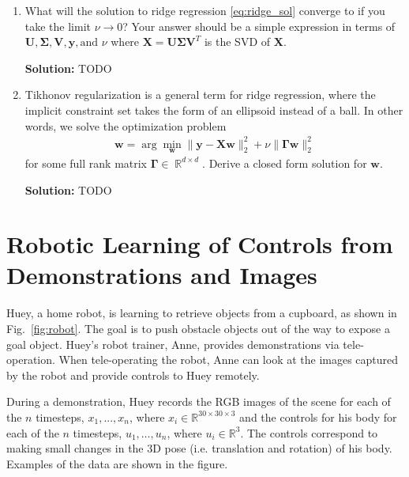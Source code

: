 \documentclass{article}
\newcommand{\mat}[1]{\mathbf{#1}}
\renewcommand{\vec}[1]{\boldsymbol{\mathbf{#1}}}
\newcommand{\Question}[1]{\Large \section{ #1 } \normalsize}
\DeclareMathOperator{\R}{\mathbb{R}}
\newenvironment{solution}{\color{blue} \smallskip \textbf{Solution:}}{}
\begin{document}
\begin{enumerate}
    \emph{Hint:} To make this point, it may be helpful to consider $\vec{w} = \vec{w}_0 + \vec{w}^*$ where $\vec{w}_0$ is in the null space of $\mat X$ and $\vec{w}^*$ is a solution.
    
    \begin{solution}
        TODO
    \end{solution}

    \newpage
    \item What will the solution to ridge regression \eqref{eq:ridge_sol} converge to if you take the limit $\nu \rightarrow 0$? Your answer should be a simple expression in terms of $\mat{U}, \mat{\Sigma}, \mat{V}, \vec{y}, \text{and } \nu$ where $\mat{X} = \mat{U}\mat{\Sigma}\mat{V}^{T}$ is the SVD of $\mat{X}$.
    
    \begin{solution}
        TODO
    \end{solution}

    \newpage
    \item Tikhonov regularization is a general term for ridge regression, where the implicit constraint set takes the form of an ellipsoid instead of a ball. In other words, we solve the optimization problem
    \begin{align*}
        \vec{w} = \arg\min_{\vec{w}} \|\vec{y} - \mat{X}\vec{w}\|_2^2 + \nu\|\mat{\Gamma}\vec{w}\|_2^2
    \end{align*}
    for some full rank matrix $\mat{\Gamma} \in \R^{d \times d}$. Derive a closed form solution for $\vec{w}$.
    
    \begin{solution}
        TODO
    \end{solution}

\end{enumerate}

\newpage
\Question{Robotic Learning of Controls from Demonstrations and Images}

Huey, a home robot, is learning to retrieve objects from a cupboard, as shown in Fig.~\ref{fig:robot}. The goal is to push obstacle objects out of the way to expose a goal object.  Huey's robot trainer, Anne, provides demonstrations via tele-operation. When tele-operating the robot, Anne can look at the images captured by the robot and provide controls to Huey remotely.

During a demonstration, Huey records the RGB images of the scene for each of the $n$ timesteps, $x_1,...,x_{n}$, where $x_i \in \mathbb{R}^{30\times 30\times 3}$ and the controls for his body for each of the $n$ timesteps, $u_1,\ldots,u_{n}$, where $u_i \in \mathbb{R}^3$. The controls correspond to making small changes in the 3D pose (i.e. translation and rotation) of his body. Examples of the data are shown in the figure. 
\end{document}
